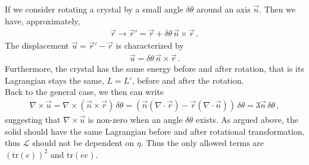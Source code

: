 \documentclass[11pt, onesided]{book}
\theoremstyle{break}
\theoremstyle{break}
\begin{document}
If we consider rotating a crystal by a small angle $\delta \theta$ around an axis $\vec{n}$. Then we have, approximately,
\begin{align*}
\vec{r} \to \vec{r}' = \vec{r} + \delta \theta\,\vec{n}\times \vec{r}\,,
\end{align*}
The displacement $\vec{u} = \vec{r}' - \vec{r}$ is characterized by
\begin{align*}
\vec{u} = \delta \theta\, \vec{n}\times \vec{r}\,.
\end{align*}
Furthermore, the crystal has the same energy before and after rotation, that is its Lagrangian stays the same, $L = L'$, before and after the rotation. \\

 
Back to the general case, we then can write
\begin{align*}
\nabla \times \vec{u} = \nabla \times (\vec{n}\times \vec{r})\, \delta \theta = \left(\vec{n}(\nabla \cdot \vec{r}) - \vec{r}(\nabla \cdot \vec{n})\right) \, \delta\theta = 3\vec{n}\,\delta\theta\,,
\end{align*}
suggesting that $\nabla\times \vec{u}$ is non-zero when an angle $\delta \theta$ exists. As argued above, the solid should have the same Lagrangian before and after rotational transformation, thus $\mathcal{L}$ should not be dependent on $\eta$. Thus the only allowed terms are $(\text{tr}(e))^2$ and $\text{tr}(ee)$.\\
\end{document}
